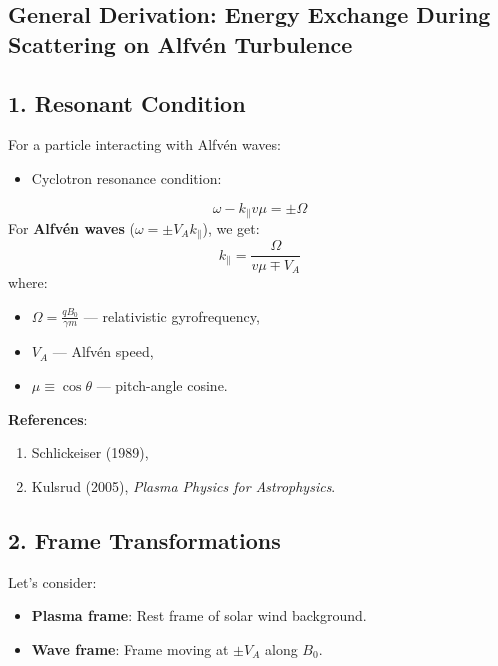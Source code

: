 \subsection{\textbf{General Derivation: Energy Exchange During Scattering on Alfvén Turbulence}}

\hrulefill

\subsection*{1. \textbf{Resonant Condition}}

For a particle interacting with Alfvén waves:
\begin{itemize}
    \item Cyclotron resonance condition:
\end{itemize}
\begin{equation}
\omega - k_\parallel v \mu = \pm \Omega
\tag{1}
\end{equation}
For \textbf{Alfvén waves} ($\omega = \pm V_A k_\parallel$), we get:
\begin{equation}
k_\parallel = \frac{\Omega}{v \mu \mp V_A}
\tag{2}
\end{equation}
where:
\begin{itemize}
    \item $\Omega = \frac{q B_0}{\gamma m}$ --- relativistic gyrofrequency,
    \item $V_A$ --- Alfvén speed,
    \item $\mu \equiv \cos\theta$ --- pitch-angle cosine.
\end{itemize}

\noindent
\textbf{References}:
\begin{enumerate}
    \item Schlickeiser (1989),
    \item Kulsrud (2005), \textit{Plasma Physics for Astrophysics}.
\end{enumerate}

\hrulefill

\subsection*{2. \textbf{Frame Transformations}}

Let’s consider:
\begin{itemize}
    \item \textbf{Plasma frame}: Rest frame of solar wind background.
    \item \textbf{Wave frame}: Frame moving at $\pm V_A$ along $B_0$.
\end{itemize}

